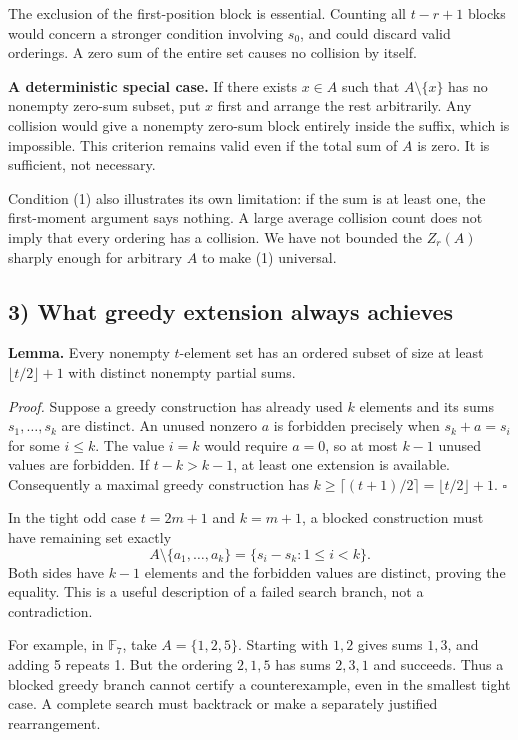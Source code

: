 The exclusion of the first-position block is essential. Counting all $t-r+1$ blocks would concern a stronger condition involving $s_0$, and could discard valid orderings. A zero sum of the entire set causes no collision by itself.

\textbf{A deterministic special case.} If there exists $x\in A$ such that $A\setminus\{x\}$ has no nonempty zero-sum subset, put $x$ first and arrange the rest arbitrarily. Any collision would give a nonempty zero-sum block entirely inside the suffix, which is impossible. This criterion remains valid even if the total sum of $A$ is zero. It is sufficient, not necessary.

Condition (1) also illustrates its own limitation: if the sum is at least one, the first-moment argument says nothing. A large average collision count does not imply that every ordering has a collision. We have not bounded the $Z_r(A)$ sharply enough for arbitrary $A$ to make (1) universal.

\subsection*{3) What greedy extension always achieves}
\textbf{Lemma.} Every nonempty $t$-element set has an ordered subset of size at least $\lfloor t/2\rfloor+1$ with distinct nonempty partial sums.

\emph{Proof.} Suppose a greedy construction has already used $k$ elements and its sums $s_1,\ldots,s_k$ are distinct. An unused nonzero $a$ is forbidden precisely when $s_k+a=s_i$ for some $i\leq k$. The value $i=k$ would require $a=0$, so at most $k-1$ unused values are forbidden. If $t-k>k-1$, at least one extension is available. Consequently a maximal greedy construction has $k\geq\lceil(t+1)/2\rceil=\lfloor t/2\rfloor+1$. $\square$

In the tight odd case $t=2m+1$ and $k=m+1$, a blocked construction must have remaining set exactly
\[
 A\setminus\{a_1,\ldots,a_k\}=\{s_i-s_k:1\leq i<k\}.
\tag{2}
\]
Both sides have $k-1$ elements and the forbidden values are distinct, proving the equality. This is a useful description of a failed search branch, not a contradiction.

For example, in $\mathbb F_7$, take $A=\{1,2,5\}$. Starting with $1,2$ gives sums $1,3$, and adding 5 repeats 1. But the ordering $2,1,5$ has sums $2,3,1$ and succeeds. Thus a blocked greedy branch cannot certify a counterexample, even in the smallest tight case. A complete search must backtrack or make a separately justified rearrangement.

